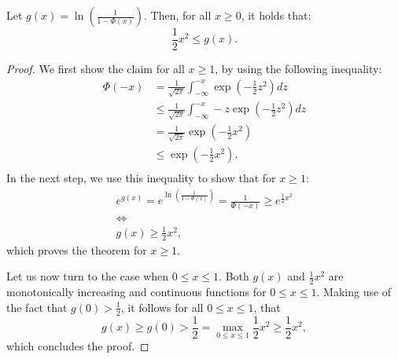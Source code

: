 \begin{lemma}
    \label{lemma:lower-bound}
    Let $g(x) = \ln \left( \frac{1}{1 - \Phi(x)}\right)$.
    Then, for all $x \geq 0$, it holds that:
    \begin{equation*}
        \frac{1}{2} x^2 \leq g(x).
    \end{equation*}
\end{lemma}
\begin{proof}
    We first show the claim for all $x \geq 1$, by using the following
    inequality:
    \begin{align*}
        \Phi(-x) & = \frac{1}{\sqrt{2 \pi}} \int_{-\infty}^{-x} \exp{ \left(-\frac{1}{2} z^2 \right)} dz       \\
                 & \leq \frac{1}{\sqrt{2 \pi}} \int_{-\infty}^{-x} -z \exp{ \left(-\frac{1}{2} z^2 \right)} dz \\
                 & = \frac{1}{\sqrt{2 \pi}} \exp{\left( -\frac{1}{2} x^2 \right)}                              \\
                 & \leq \exp{\left( -\frac{1}{2} x^2 \right)}.                                                 \\
    \end{align*}
    In the next step, we use this inequality to show that for $x \geq 1$:
    \begin{gather*}
        e^{g(x)} = e^{\ln \left( \frac{1}{1 - \Phi(x)} \right)} = \frac{1}{\Phi(-x)} \geq e^{\frac{1}{2} x^2}\\
        \iff \\
        g(x) \geq \frac{1}{2} x^2,
    \end{gather*}
    which proves the theorem for $x \geq 1$.

    Let us now turn to the case when $0 \leq x \leq 1$.
    Both $g(x)$ and $\frac{1}{2}x^2$ are monotonically increasing
    and continuous functions for $0 \leq x \leq 1$.
    Making use of the fact that $g(0) > \frac{1}{2}$, it follows
    for all $0 \leq x \leq 1$, that
    \begin{equation*}
        g(x) \geq g(0) > \frac{1}{2} = \max_{0 \leq x \leq 1} \frac{1}{2} x^2 \geq \frac{1}{2} x^2,
    \end{equation*}
    which concludes the proof.
\end{proof}

